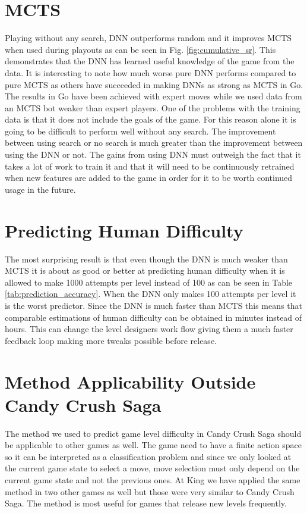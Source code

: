 \documentclass{kththesis}
\begin{document}
\section{MCTS}
Playing without any search, DNN outperforms random and it improves MCTS when used during playouts as can be seen in Fig. \ref{fig:cumulative_sr}. This demonstrates  that the DNN has learned useful knowledge of the game from the data. It is interesting to note how much worse pure DNN performs compared to pure MCTS as others have succeeded in making DNNs as strong as MCTS in Go. The results in Go have been achieved with expert moves while we used data from an MCTS bot weaker than expert players. One of the problems with the training data is that it does not include the goals of the game. For this reason alone it is going to be difficult to perform well without any search. The improvement between using search or no search is much greater than the improvement between using the DNN or not. The gains from using DNN must outweigh the fact that it takes a lot of work to train it and that it will need to be continuously retrained when new features are added to the game in order for it to be worth continued usage in the future.

\section{Predicting Human Difficulty}
The most surprising result is that even though the DNN is much weaker than MCTS it is about as good or better at predicting human difficulty when it is allowed to make 1000 attempts per level instead of 100 as can be seen in Table \ref{tab:prediction_accuracy}. When the DNN only makes 100 attempts per level it is the worst predictor. Since the DNN is much faster than MCTS this means that comparable estimations of human difficulty can be obtained in minutes instead of hours. This can change the level designers work flow  giving them a much faster feedback loop making more tweaks possible before release.

\section{Method Applicability Outside Candy Crush Saga}
The method we used to predict game level difficulty in Candy Crush Saga should be applicable to other games as well. The game need to have a finite action space so it can be interpreted as a classification problem and since we only looked at the current game state to select a move, move selection must only depend on the current game state and not the previous ones. At King we have applied the same method in two other games as well but those were very similar to Candy Crush Saga. The method is most useful for games that release new levels frequently.
\end{document}
